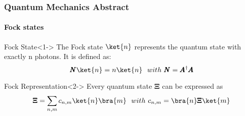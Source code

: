 \begin{frame}
    \frametitle{Quantum Mechanics Abstract}
    \framesubtitle{Fock states}

    \begin{block}{Fock State}<1->
        The Fock state $\ket{n}$ represents the quantum state with exactly n photons. It is 
        defined as:
        \begin{equation*}
            \pmb{N}\ket{n}=n\ket{n}\ \ with\ \pmb{N}=\pmb{A}^\dagger \pmb{A}
        \end{equation*}
    \end{block}
    \begin{alertblock}{Fock Representation}<2->
        Every quantum state $\pmb{\Xi}$ can be expressed as
        \begin{equation*}
            \pmb{\Xi} = \sum_{n,m} c_{n,m}\ket{n}\bra{m}\ \ with\ c_{n,m}=\bra{n}\pmb{\Xi}\ket{m}
        \end{equation*}
    \end{alertblock}

\end{frame}
